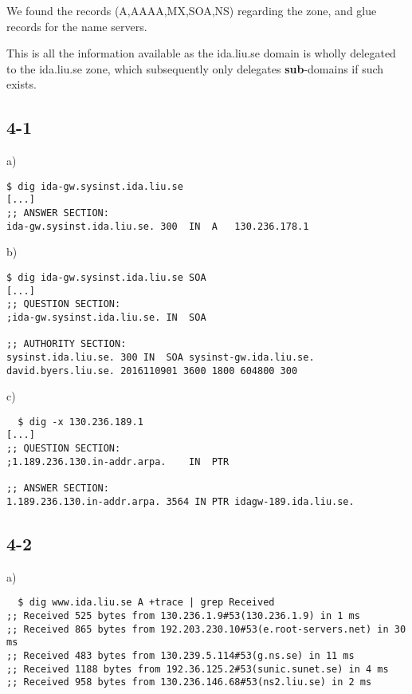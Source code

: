 We found the records (A,AAAA,MX,SOA,NS) regarding the zone, and glue records for the name servers.

This is all the information available as the ida.liu.se domain is wholly delegated to the ida.liu.se zone, which subsequently only delegates \textbf{sub}-domains if such exists.

\subsection{4-1}
a) \begin{verbatim}$ dig ida-gw.sysinst.ida.liu.se
[...]
;; ANSWER SECTION:
ida-gw.sysinst.ida.liu.se. 300	IN	A	130.236.178.1
\end{verbatim}

b) \begin{verbatim}
$ dig ida-gw.sysinst.ida.liu.se SOA
[...]
;; QUESTION SECTION:
;ida-gw.sysinst.ida.liu.se.	IN	SOA

;; AUTHORITY SECTION:
sysinst.ida.liu.se.	300	IN	SOA	sysinst-gw.ida.liu.se. david.byers.liu.se. 2016110901 3600 1800 604800 300
\end{verbatim}

c) \begin{verbatim}
  $ dig -x 130.236.189.1
[...]
;; QUESTION SECTION:
;1.189.236.130.in-addr.arpa.	IN	PTR

;; ANSWER SECTION:
1.189.236.130.in-addr.arpa. 3564 IN	PTR	idagw-189.ida.liu.se.
\end{verbatim}


\subsection{4-2}
a) \begin{verbatim}
  $ dig www.ida.liu.se A +trace | grep Received
;; Received 525 bytes from 130.236.1.9#53(130.236.1.9) in 1 ms
;; Received 865 bytes from 192.203.230.10#53(e.root-servers.net) in 30 ms
;; Received 483 bytes from 130.239.5.114#53(g.ns.se) in 11 ms
;; Received 1188 bytes from 192.36.125.2#53(sunic.sunet.se) in 4 ms
;; Received 958 bytes from 130.236.146.68#53(ns2.liu.se) in 2 ms
\end{verbatim}

